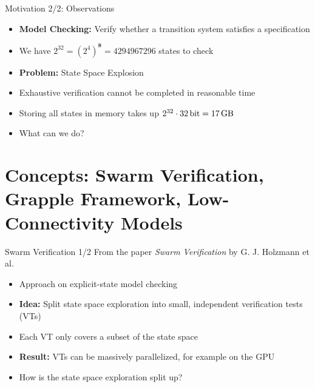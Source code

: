 \documentclass[aspectratio=169]{beamer}
\begin{document}
\begin{frame}{Motivation 2/2: Observations}
    \begin{itemize}
        \item \textbf{Model Checking:} Verify whether a transition system satisfies a specification
              \medskip
        \item We have $2^{32} = \left(2^4\right)^{\boldsymbol{8}} = \num{4294967296}$ states to check
        \item \textbf{Problem:} State Space Explosion
        \item Exhaustive verification cannot be completed in reasonable time
        \item Storing all states in memory takes up $2^{32} \cdot \SI{32}{\bit} = \SI{17}{\giga\byte}$
        \item What can we do?
    \end{itemize}
\end{frame}

\section{Concepts: Swarm Verification, Grapple Framework, Low-Connectivity Models}

\begin{frame}{Swarm Verification 1/2}
    From the paper \emph{Swarm Verification} by G. J. Holzmann et al. \cite{Holzmann2008.Swarm-Verification}
    \begin{itemize}
        \item Approach on explicit-state model checking
        \item \textbf{Idea:} Split state space exploration into small, independent verification tests (VTs)
        \item Each VT only covers a subset of the state space
        \item \textbf{Result:} VTs can be massively parallelized, for example on the GPU
        \item How is the state space exploration split up?
    \end{itemize}
\end{frame}
\end{document}
